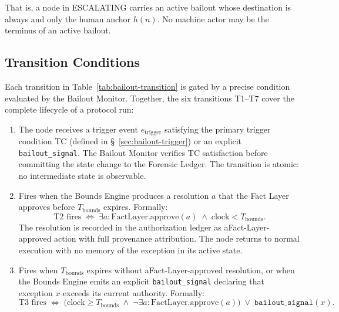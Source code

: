 That is, a node in ESCALATING carries an active bailout whose destination is always and only the human anchor $h(n)$. No machine actor may be the terminus of an active bailout.

\subsection{Transition Conditions}
\label{sec:transitions}

Each transition in Table~\ref{tab:bailout-transition} is gated by a precise condition evaluated by the Bailout Monitor. Together, the six transitions T1–T7 cover the complete lifecycle of a protocol run:

\begin{enumerate}\itemsep=0pt
\item[\textbf{T1 — IDLE $\rightarrow$ BOUNDED (trigger):}] The node receives a trigger event $e_{\text{trigger}}$ satisfying the primary trigger condition TC (defined in \S~\ref{sec:bailout-trigger}) or an explicit \texttt{bailout\_signal}. The Bailout Monitor verifies TC satisfaction before committing the state change to the Forensic Ledger. The transition is atomic: no intermediate state is observable.

\item[\textbf{T2 — BOUNDED $\rightarrow$ IDLE (resolution):}] Fires when the Bounds Engine produces a resolution $a$ that the Fact Layer approves before $T_{\text{bounds}}$ expires. Formally:
\begin{equation}
\text{T2 fires} \;\iff\; \exists a : \text{FactLayer.approve}(a) \;\land\; \text{clock} < T_{\text{bounds}}. \tag{T2}
\end{equation}
The resolution is recorded in the authorization ledger as aFact-Layer-approved action with full provenance attribution. The node returns to normal execution with no memory of the exception in its active state.

\item[\textbf{T3 — BOUNDED $\rightarrow$ BAIL\_PENDING (escalation):}] Fires when $T_{\text{bounds}}$ expires without aFact-Layer-approved resolution, or when the Bounds Engine emits an explicit \texttt{bailout\_signal} declaring that exception $x$ exceeds its current authority. Formally:
\begin{equation}
\text{T3 fires} \;\iff\; \bigl(\text{clock} \geq T_{\text{bounds}} \;\land\; \neg\exists a : \text{FactLayer.approve}(a)\bigr) \;\lor\; \texttt{bailout\_signal}(x). \tag{T3}
\end{equation}


\end{enumerate}
